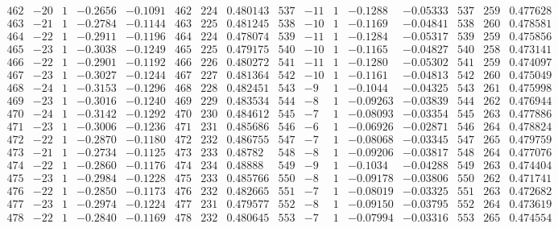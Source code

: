 \documentclass[11pt,reqno,a4letter]{article}
\numberwithin{figure}{section}
\numberwithin{table}{section}
\theoremstyle{plain}
\numberwithin{theorem}{section}
\theoremstyle{definition}
\begin{document}
\begin{table}[ht]
\begin{equation*}
{\begin{array}{ccccc|ccc|ccccc|ccc}
 462 & -20 & 1 & -0.2656 & -0.1091 & 462 & 224 & 0.480143 & 537 & -11 & 1 & -0.1288 & -0.05333 & 537 & 259 & 0.477628 \\
 463 & -21 & 1 & -0.2784 & -0.1144 & 463 & 225 & 0.481245 & 538 & -10 & 1 & -0.1169 & -0.04841 & 538 & 260 & 0.478581 \\
 464 & -22 & 1 & -0.2911 & -0.1196 & 464 & 224 & 0.478074 & 539 & -11 & 1 & -0.1284 & -0.05317 & 539 & 259 & 0.475856 \\
 465 & -23 & 1 & -0.3038 & -0.1249 & 465 & 225 & 0.479175 & 540 & -10 & 1 & -0.1165 & -0.04827 & 540 & 258 & 0.473141 \\
 466 & -22 & 1 & -0.2901 & -0.1192 & 466 & 226 & 0.480272 & 541 & -11 & 1 & -0.1280 & -0.05302 & 541 & 259 & 0.474097 \\
 467 & -23 & 1 & -0.3027 & -0.1244 & 467 & 227 & 0.481364 & 542 & -10 & 1 & -0.1161 & -0.04813 & 542 & 260 & 0.475049 \\
 468 & -24 & 1 & -0.3153 & -0.1296 & 468 & 228 & 0.482451 & 543 & -9 & 1 & -0.1044 & -0.04325 & 543 & 261 & 0.475998 \\
 469 & -23 & 1 & -0.3016 & -0.1240 & 469 & 229 & 0.483534 & 544 & -8 & 1 & -0.09263 & -0.03839 & 544 & 262 & 0.476944 \\
 470 & -24 & 1 & -0.3142 & -0.1292 & 470 & 230 & 0.484612 & 545 & -7 & 1 & -0.08093 & -0.03354 & 545 & 263 & 0.477886 \\
 471 & -23 & 1 & -0.3006 & -0.1236 & 471 & 231 & 0.485686 & 546 & -6 & 1 & -0.06926 & -0.02871 & 546 & 264 & 0.478824 \\
 472 & -22 & 1 & -0.2870 & -0.1180 & 472 & 232 & 0.486755 & 547 & -7 & 1 & -0.08068 & -0.03345 & 547 & 265 & 0.479759 \\
 473 & -21 & 1 & -0.2734 & -0.1125 & 473 & 233 & 0.48782 & 548 & -8 & 1 & -0.09206 & -0.03817 & 548 & 264 & 0.477076 \\
 474 & -22 & 1 & -0.2860 & -0.1176 & 474 & 234 & 0.48888 & 549 & -9 & 1 & -0.1034 & -0.04288 & 549 & 263 & 0.474404 \\
 475 & -23 & 1 & -0.2984 & -0.1228 & 475 & 233 & 0.485766 & 550 & -8 & 1 & -0.09178 & -0.03806 & 550 & 262 & 0.471741 \\
 476 & -22 & 1 & -0.2850 & -0.1173 & 476 & 232 & 0.482665 & 551 & -7 & 1 & -0.08019 & -0.03325 & 551 & 263 & 0.472682 \\
 477 & -23 & 1 & -0.2974 & -0.1224 & 477 & 231 & 0.479577 & 552 & -8 & 1 & -0.09150 & -0.03795 & 552 & 264 & 0.473619 \\
 478 & -22 & 1 & -0.2840 & -0.1169 & 478 & 232 & 0.480645 & 553 & -7 & 1 & -0.07994 & -0.03316 & 553 & 265 & 0.474554 \\

\end{array}}
\end{equation*}
\end{table}
\end{document}
